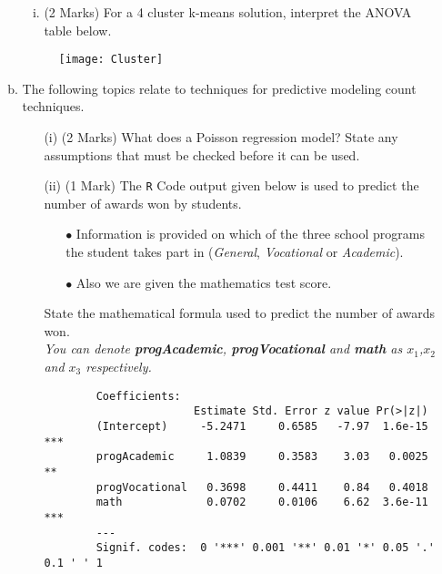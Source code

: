 \documentclass[a4paper,12pt]{article}
\begin{document}
\begin{enumerate}
\begin{enumerate}[(a)]
\begin{enumerate}[(i)]
	\item (2 Marks) For a 4 cluster k-means solution, interpret the ANOVA table below.
\end{enumerate}


\begin{figure}[h!]
	\centering
	\texttt{[image: Cluster]}
\end{figure}


	 
%
%
%
%
%
\item The following topics relate to techniques for predictive modeling count techniques.


\begin{itemize}
	\item[(i)] (2 Marks)
	What does a Poisson regression model? State any assumptions that must be checked before it can be used.
	
	\item[(ii)] (1 Mark) The \texttt{R} Code output given below is used to predict the number of awards won by students. \begin{itemize} 
		\item[$\bullet$] Information is provided on which of the three school programs the student takes part in (\textit{General}, \textit{Vocational} or \textit{Academic}). 
		\item[$\bullet$] Also we are given the mathematics test score.
	\end{itemize}
	State the mathematical formula used to predict the number of awards won.\\
	\textit{You can denote \textbf{progAcademic}, \textbf{progVocational} and \textbf{math} as $x_1$,$x_2$ and $x_3$ respectively.}
	
	
	\begin{framed}
		\begin{verbatim}
		Coefficients:
		               Estimate Std. Error z value Pr(>|z|)    
		(Intercept)     -5.2471     0.6585   -7.97  1.6e-15 ***
		progAcademic     1.0839     0.3583    3.03   0.0025 ** 
		progVocational   0.3698     0.4411    0.84   0.4018    
		math             0.0702     0.0106    6.62  3.6e-11 ***
		---
		Signif. codes:  0 '***' 0.001 '**' 0.01 '*' 0.05 '.' 0.1 ' ' 1
		

\end{verbatim}
\end{framed}
\end{itemize}
\end{enumerate}
\end{enumerate}
\end{document}
